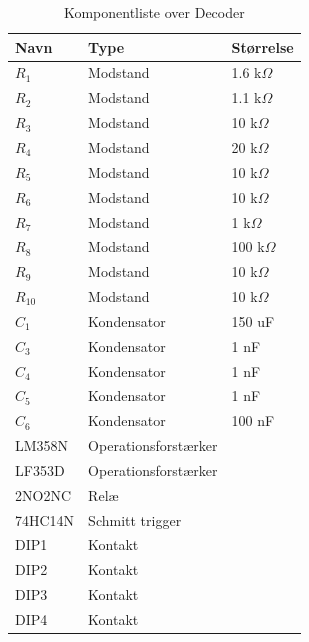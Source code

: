 \begin{table}[htbp] \centering
\caption{Komponentliste over Decoder}
\begin{small}
    \begin{tabular}{|p{2cm}|p{4cm}|p{2cm}|}
    \hline
    \textbf{Navn}    & \textbf{Type}                 & \textbf{Størrelse} \\ \hline
   
    $R_1$      & Modstand             & 1.6 k$\Omega$    \\ \hline
    $R_2$      & Modstand             & 1.1 k$\Omega$    \\ \hline
    $R_3$      & Modstand             & 10 k$\Omega$    \\ \hline
    $R_4$      & Modstand             & 20 k$\Omega$    \\ \hline
    $R_5$      & Modstand             & 10 k$\Omega$    \\ \hline
    $R_6$      & Modstand             & 10 k$\Omega$    \\ \hline
    $R_7$      & Modstand             & 1 k$\Omega$    \\ \hline
    $R_8$      & Modstand             & 100 k$\Omega$    \\ \hline
    $R_9$      & Modstand             & 10 k$\Omega$    \\ \hline
    $R_{10}$     & Modstand             & 10 k$\Omega$    \\ \hline
    $C_1$      & Kondensator          & 150 uF    \\ \hline
    $C_3$      & Kondensator          & 1 nF    \\ \hline
    $C_4$      & Kondensator          & 1 nF    \\ \hline
    $C_5$      & Kondensator          & 1 nF    \\ \hline
    $C_6$      & Kondensator          & 100 nF    \\ \hline
    LM358N     & Operationsforstærker & ~         \\ \hline
    LF353D     & Operationsforstærker & ~         \\ \hline
    2NO2NC     & Relæ				  & ~         \\ \hline
    74HC14N    & Schmitt trigger	  & ~         \\ \hline
    DIP1       & Kontakt	          & ~         \\ \hline
    DIP2       & Kontakt	          & ~         \\ \hline
    DIP3       & Kontakt	          & ~         \\ \hline
    DIP4       & Kontakt	          & ~         \\ \hline
   
    \end{tabular}
   \end{small}
\label{table:Komponentliste Decoder}
\end{table}
\newpage

